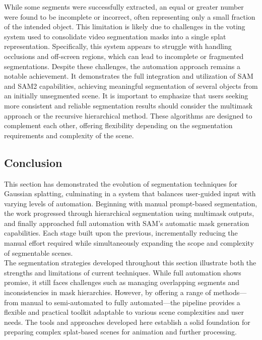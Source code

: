 \documentclass[12pt]{article}
\begin{document}
While some segments were successfully extracted, an equal or greater number were found to be incomplete or incorrect, often representing only a small fraction of the intended object. This limitation is likely due to challenges in the voting system used to consolidate video segmentation masks into a single splat representation. Specifically, this system appears to struggle with handling occlusions and off-screen regions, which can lead to incomplete or fragmented segmentations. Despite these challenges, the automation approach remains a notable achievement. It demonstrates the full integration and utilization of SAM and SAM2 capabilities, achieving meaningful segmentation of several objects from an initially unsegmented scene. It is important to emphasize that users seeking more consistent and reliable segmentation results should consider the multimask approach or the recursive hierarchical method. These algorithms are designed to complement each other, offering flexibility depending on the segmentation requirements and complexity of the scene.
\subsection{Conclusion}
This section has demonstrated the evolution of segmentation techniques for Gaussian splatting, culminating in a system that balances user-guided input with varying levels of automation. Beginning with manual prompt-based segmentation, the work progressed through hierarchical segmentation using multimask outputs, and finally approached full automation with SAM’s automatic mask generation capabilities. Each stage built upon the previous, incrementally reducing the manual effort required while simultaneously expanding the scope and complexity of segmentable scenes.
\\
The segmentation strategies developed throughout this section illustrate both the strengths and limitations of current techniques. While full automation shows promise, it still faces challenges such as managing overlapping segments and inconsistencies in mask hierarchies. However, by offering a range of methods—from manual to semi-automated to fully automated—the pipeline provides a flexible and practical toolkit adaptable to various scene complexities and user needs. The tools and approaches developed here establish a solid foundation for preparing complex splat-based scenes for animation and further processing.
\end{document}
